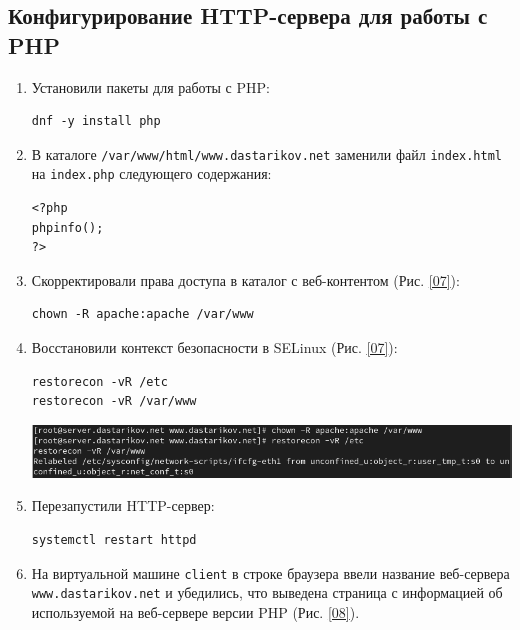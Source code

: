 \subsection{Конфигурирование HTTP-сервера для работы с PHP}
\begin{enumerate}
\item Установили пакеты для работы с PHP:
\begin{verbatim}
dnf -y install php
\end{verbatim}
\item В каталоге \texttt{/var/www/html/www.dastarikov.net} заменили файл \texttt{index.html} на \texttt{index.php} следующего содержания:
\begin{verbatim}
<?php
phpinfo();
?>
\end{verbatim}
\item Скорректировали права доступа в каталог с веб-контентом (Рис. \ref{07}):
\begin{verbatim}
chown -R apache:apache /var/www
\end{verbatim}
\item Восстановили контекст безопасности в SELinux (Рис. \ref{07}):
\begin{verbatim}
restorecon -vR /etc
restorecon -vR /var/www
\end{verbatim}

\begin{center}
    \centering
    \includegraphics[width=\textwidth]{../images/image07.png}
    \label{07}
\end{center}

\item Перезапустили HTTP-сервер:
\begin{verbatim}
systemctl restart httpd
\end{verbatim}
\item На виртуальной машине \texttt{client} в строке браузера ввели название веб-сервера \texttt{www.dastarikov.net} и убедились, что выведена страница с информацией об используемой на веб-сервере версии PHP (Рис. \ref{08}).
  

\end{enumerate}
